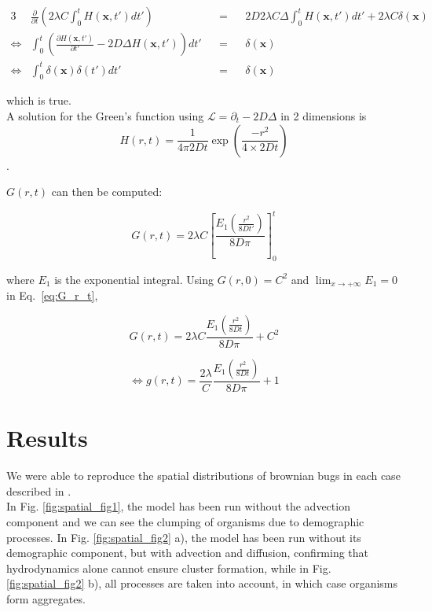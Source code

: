 \begin{alignat}{3}
 & \frac{\partial}{\partial t}\left(2\lambda C\int_{0}^{t}H(\boldsymbol{x},t')dt'\right) & & = & & 2D2\lambda C\Delta\int_{0}^{t}H(\boldsymbol{x},t')dt'+2\lambda C\delta(\boldsymbol{x})\\
\Leftrightarrow & \int_{0}^{t}\left(\frac{\partial H(\boldsymbol{x},t')}{\partial t'}-2D\Delta H(\boldsymbol{x},t')\right)dt' & & = & & \delta(\boldsymbol{x})\\
\Leftrightarrow & \int_{0}^{t}\delta(\boldsymbol{x})\delta(t')dt' & & = & & \delta(\boldsymbol{x})
\end{alignat}

which is true. \\

A solution for the Green's function using $\mathcal{L}=\partial_{t}-2D\Delta$
in 2 dimensions is $$H(r,t)=\frac{1}{4\pi2Dt}\exp(\frac{-r^{2}}{4\times2Dt})$$. 

$G(r,t)$ can then be computed:

\begin{equation}
G(r,t)=2\lambda C\left[\frac{E_1 \left(\frac{r^{2}}{8Dt'}\right)}{8D\pi}\right]_{0}^{t}\label{eq:G_r_t}
\end{equation}

where $E_1$ is the exponential integral. Using $G(r,0)=C^{2}$ and
$\lim_{x\rightarrow+\infty}E_1=0$ in Eq.~\ref{eq:G_r_t}, 

\begin{equation}
G(r,t)=2\lambda C\frac{E_1\left(\frac{r^{2}}{8Dt}\right)}{8D\pi}+C^{2}
\end{equation}

\begin{equation}
\Leftrightarrow g(r,t)=\frac{2\lambda}{C}\frac{E_1\left(\frac{r^{2}}{8Dt}\right)}{8D\pi}+1
\end{equation}

\section*{Results}

We were able to reproduce the spatial distributions of brownian bugs in each case described in \cite{young_reproductive_2001}.\\

In Fig. \ref{fig:spatial_fig1}, the model has been run without the advection component and we can see the clumping of organisms due to demographic processes. In Fig. \ref{fig:spatial_fig2} a), the model has been run without its demographic component, but with advection and diffusion, confirming that hydrodynamics alone cannot ensure cluster formation, while in Fig.  \ref{fig:spatial_fig2} b), all processes are taken into account, in which case organisms form aggregates.\\
  
